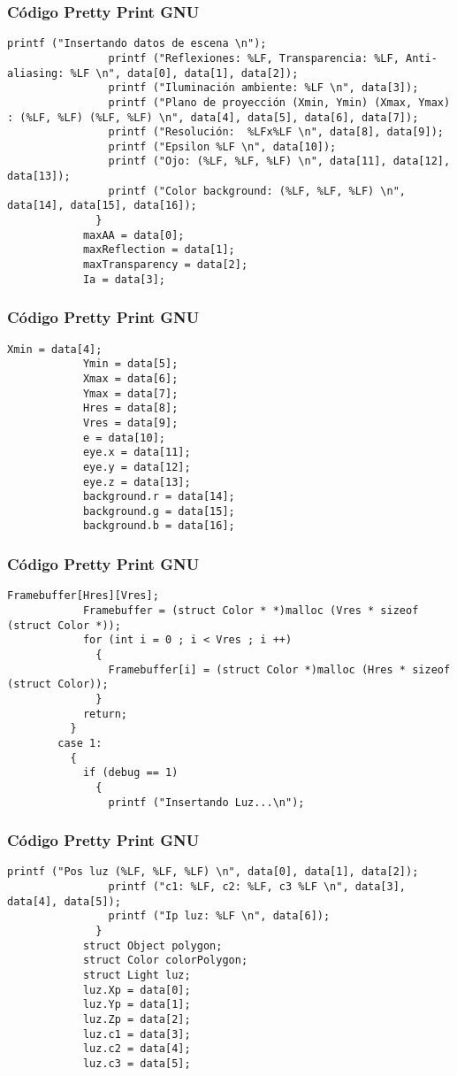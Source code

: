 \documentclass{beamer}
\begin{document}
\begin{frame}[fragile]
\frametitle{C\'odigo Pretty Print GNU}
\begin{lstlisting}[style=CStyle]
                printf ("Insertando datos de escena \n");
                printf ("Reflexiones: %LF, Transparencia: %LF, Anti-aliasing: %LF \n", data[0], data[1], data[2]);
                printf ("Iluminación ambiente: %LF \n", data[3]);
                printf ("Plano de proyección (Xmin, Ymin) (Xmax, Ymax) : (%LF, %LF) (%LF, %LF) \n", data[4], data[5], data[6], data[7]);
                printf ("Resolución:  %LFx%LF \n", data[8], data[9]);
                printf ("Epsilon %LF \n", data[10]);
                printf ("Ojo: (%LF, %LF, %LF) \n", data[11], data[12], data[13]);
                printf ("Color background: (%LF, %LF, %LF) \n", data[14], data[15], data[16]);
              }
            maxAA = data[0];
            maxReflection = data[1];
            maxTransparency = data[2];
            Ia = data[3];
\end{lstlisting}
\end{frame}
\begin{frame}[fragile]
\frametitle{C\'odigo Pretty Print GNU}
\begin{lstlisting}[style=CStyle]
            Xmin = data[4];
            Ymin = data[5];
            Xmax = data[6];
            Ymax = data[7];
            Hres = data[8];
            Vres = data[9];
            e = data[10];
            eye.x = data[11];
            eye.y = data[12];
            eye.z = data[13];
            background.r = data[14];
            background.g = data[15];
            background.b = data[16];
\end{lstlisting}
\end{frame}
\begin{frame}[fragile]
\frametitle{C\'odigo Pretty Print GNU}
\begin{lstlisting}[style=CStyle]
            Framebuffer[Hres][Vres];
            Framebuffer = (struct Color * *)malloc (Vres * sizeof (struct Color *));
            for (int i = 0 ; i < Vres ; i ++)
              {
                Framebuffer[i] = (struct Color *)malloc (Hres * sizeof (struct Color));
              }
            return;
          }
        case 1:
          {
            if (debug == 1)
              {
                printf ("Insertando Luz...\n");
\end{lstlisting}
\end{frame}
\begin{frame}[fragile]
\frametitle{C\'odigo Pretty Print GNU}
\begin{lstlisting}[style=CStyle]
                printf ("Pos luz (%LF, %LF, %LF) \n", data[0], data[1], data[2]);
                printf ("c1: %LF, c2: %LF, c3 %LF \n", data[3], data[4], data[5]);
                printf ("Ip luz: %LF \n", data[6]);
              }
            struct Object polygon;
            struct Color colorPolygon;
            struct Light luz;
            luz.Xp = data[0];
            luz.Yp = data[1];
            luz.Zp = data[2];
            luz.c1 = data[3];
            luz.c2 = data[4];
            luz.c3 = data[5];
\end{lstlisting}
\end{frame}
\end{document}
